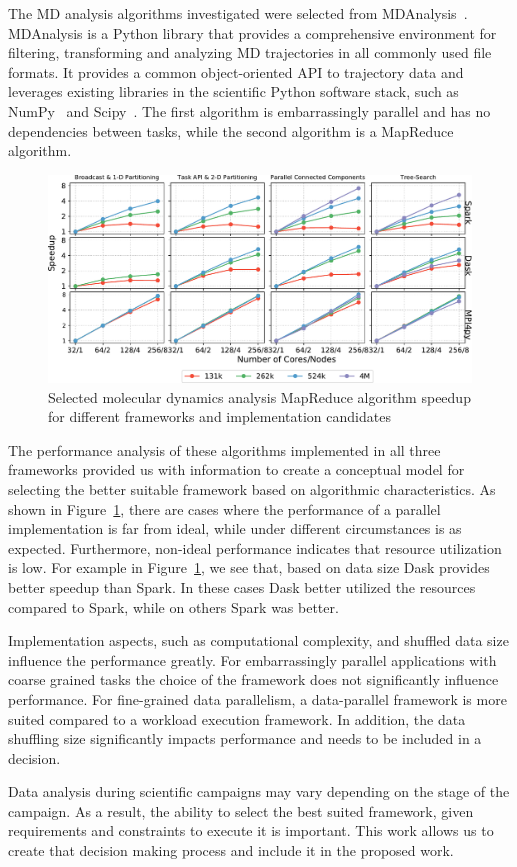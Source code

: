 The MD analysis algorithms investigated were selected from 
MDAnalysis~\cite{gowers2016mdanalysis,michaud2011mdanalysis}. MDAnalysis is a 
Python library that provides a comprehensive environment for filtering, 
transforming and analyzing MD trajectories in all commonly used file formats. It 
provides a common object-oriented API to trajectory data and leverages existing 
libraries in the scientific Python software stack, such as NumPy~\cite{numpy} 
and Scipy~\cite{scipy}. The first algorithm is embarrassingly parallel and has 
no dependencies between tasks, while the second algorithm is a MapReduce 
algorithm.

\begin{figure}[t]
    \centering
    \includegraphics[width=.95\textwidth]{figures/All4approachesWith4MSpeedup.pdf}
    \caption{Selected molecular dynamics analysis MapReduce algorithm speedup 
    for different frameworks and implementation candidates}\label{fig:leafletfinder}
\end{figure}

The performance analysis of these algorithms implemented in all three frameworks 
provided us with information to create a conceptual model for selecting the 
better suitable framework based on algorithmic characteristics. As shown in 
Figure~\ref{fig:leafletfinder}, there are cases where the performance of a 
parallel implementation is far from ideal, while under different circumstances 
is as expected. Furthermore, non-ideal performance indicates that resource 
utilization is low. For example in Figure~\ref{fig:leafletfinder}, we see that, 
based on data size Dask provides better speedup than Spark. In these cases Dask 
better utilized the resources compared to Spark, while on others Spark was 
better.

Implementation aspects, such as computational complexity, and shuffled data 
size influence the performance greatly. For embarrassingly parallel 
applications with coarse grained tasks the choice of the framework does not 
significantly influence performance. For fine-grained data parallelism, a 
data-parallel framework is more suited compared to a workload execution 
framework. In addition, the data shuffling size significantly impacts 
performance and needs to be included in a decision.

Data analysis during scientific campaigns may vary depending on the stage of 
the campaign. As a result, the ability to select the best suited framework, 
given requirements and constraints to execute it is important. This work allows 
us to create that decision making process and include it in the proposed work.
